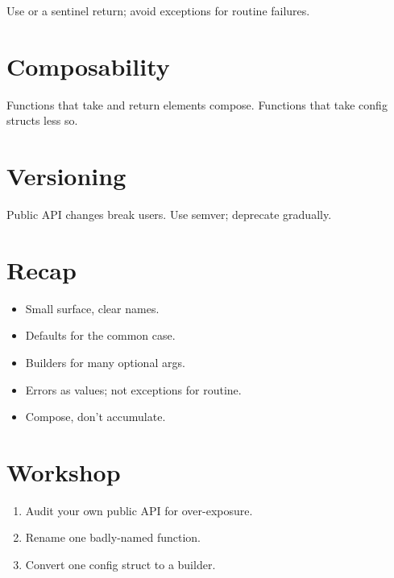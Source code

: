 Use  or a sentinel return; avoid
exceptions for routine failures.

\section{Composability}

Functions that take and return elements compose. Functions
that take config structs less so.

\section{Versioning}

Public API changes break users. Use semver; deprecate
gradually.

\section{Recap}

\begin{recap}
\begin{itemize}[leftmargin=*]
  \item Small surface, clear names.
  \item Defaults for the common case.
  \item Builders for many optional args.
  \item Errors as values; not exceptions for routine.
  \item Compose, don't accumulate.
\end{itemize}
\end{recap}

\section*{Workshop}

\begin{enumerate}[leftmargin=*]
  \item Audit your own public API for over-exposure.
  \item Rename one badly-named function.
  \item Convert one config struct to a builder.
\end{enumerate}
